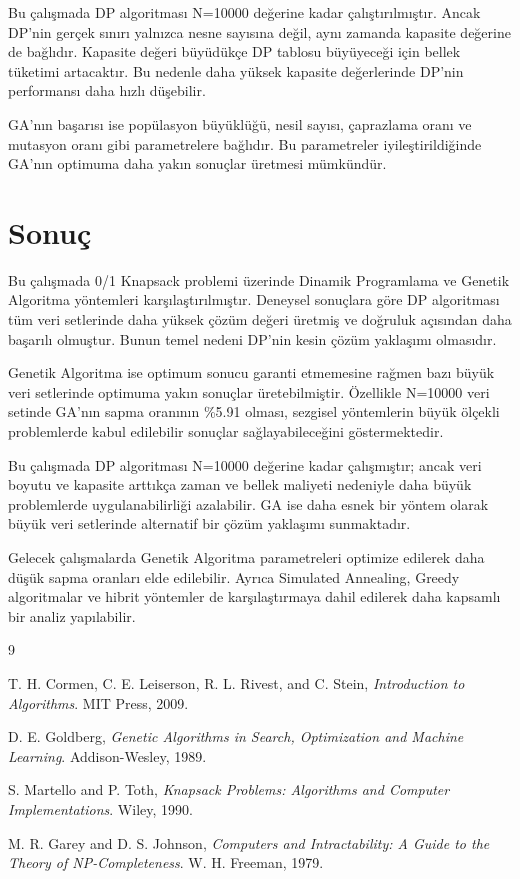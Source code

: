 \documentclass[conference]{IEEEtran}
\begin{document}
Bu çalışmada DP algoritması N=10000 değerine kadar çalıştırılmıştır. Ancak DP'nin gerçek sınırı yalnızca nesne sayısına değil, aynı zamanda kapasite değerine de bağlıdır. Kapasite değeri büyüdükçe DP tablosu büyüyeceği için bellek tüketimi artacaktır. Bu nedenle daha yüksek kapasite değerlerinde DP'nin performansı daha hızlı düşebilir.

GA'nın başarısı ise popülasyon büyüklüğü, nesil sayısı, çaprazlama oranı ve mutasyon oranı gibi parametrelere bağlıdır. Bu parametreler iyileştirildiğinde GA'nın optimuma daha yakın sonuçlar üretmesi mümkündür.

\section{Sonuç}
Bu çalışmada 0/1 Knapsack problemi üzerinde Dinamik Programlama ve Genetik Algoritma yöntemleri karşılaştırılmıştır. Deneysel sonuçlara göre DP algoritması tüm veri setlerinde daha yüksek çözüm değeri üretmiş ve doğruluk açısından daha başarılı olmuştur. Bunun temel nedeni DP'nin kesin çözüm yaklaşımı olmasıdır.

Genetik Algoritma ise optimum sonucu garanti etmemesine rağmen bazı büyük veri setlerinde optimuma yakın sonuçlar üretebilmiştir. Özellikle N=10000 veri setinde GA'nın sapma oranının \%5.91 olması, sezgisel yöntemlerin büyük ölçekli problemlerde kabul edilebilir sonuçlar sağlayabileceğini göstermektedir.

Bu çalışmada DP algoritması N=10000 değerine kadar çalışmıştır; ancak veri boyutu ve kapasite arttıkça zaman ve bellek maliyeti nedeniyle daha büyük problemlerde uygulanabilirliği azalabilir. GA ise daha esnek bir yöntem olarak büyük veri setlerinde alternatif bir çözüm yaklaşımı sunmaktadır.

Gelecek çalışmalarda Genetik Algoritma parametreleri optimize edilerek daha düşük sapma oranları elde edilebilir. Ayrıca Simulated Annealing, Greedy algoritmalar ve hibrit yöntemler de karşılaştırmaya dahil edilerek daha kapsamlı bir analiz yapılabilir.

\begin{thebibliography}{9}

T. H. Cormen, C. E. Leiserson, R. L. Rivest, and C. Stein, \textit{Introduction to Algorithms}. MIT Press, 2009.

D. E. Goldberg, \textit{Genetic Algorithms in Search, Optimization and Machine Learning}. Addison-Wesley, 1989.

S. Martello and P. Toth, \textit{Knapsack Problems: Algorithms and Computer Implementations}. Wiley, 1990.

M. R. Garey and D. S. Johnson, \textit{Computers and Intractability: A Guide to the Theory of NP-Completeness}. W. H. Freeman, 1979.

\end{thebibliography}
\end{document}

